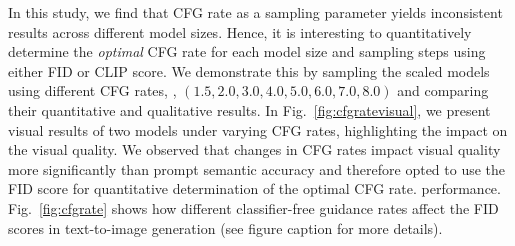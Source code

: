 In this study, we find that CFG rate as a sampling parameter yields inconsistent results across different model sizes.
Hence, it is interesting to quantitatively determine the \textit{optimal} CFG rate for each model size and sampling steps using either FID or CLIP score.
We demonstrate this by sampling the scaled models using different CFG rates, \ie, $(1.5, 2.0, 3.0, 4.0, 5.0, 6.0, 7.0, 8.0)$ and comparing their quantitative and qualitative results. 
%
%
In Fig.~\ref{fig:cfgratevisual}, we present visual results of two models under varying CFG rates, highlighting the impact on the visual quality. We observed that changes in CFG rates impact visual quality more significantly than prompt semantic accuracy and therefore opted to use the FID score for quantitative determination of the optimal CFG rate. performance. Fig.~\ref{fig:cfgrate} shows how different classifier-free guidance rates affect the FID scores in text-to-image generation (see figure caption for more details). 

